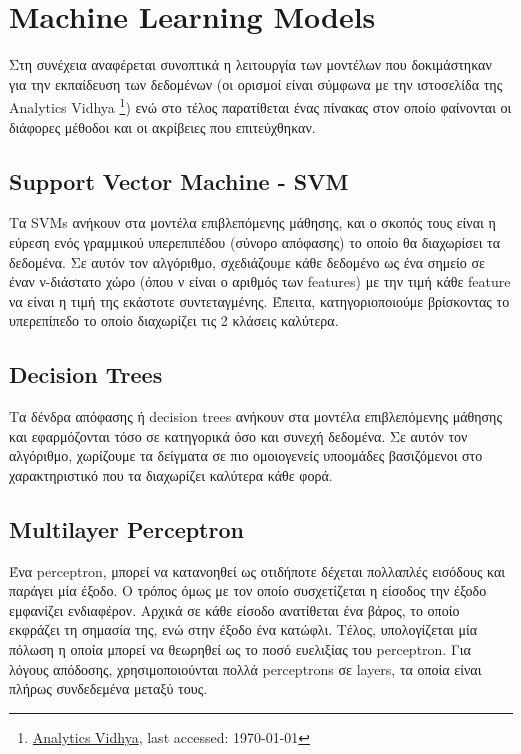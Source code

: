\section{Machine Learning Models}

Στη συνέχεια αναφέρεται συνοπτικά η λειτουργία των μοντέλων που δοκιμάστηκαν για την εκπαίδευση των δεδομένων (οι ορισμοί είναι σύμφωνα με την ιστοσελίδα της Analytics Vidhya \footnote{\href{https://www.analyticsvidhya.com/}{Analytics Vidhya}, last accessed: \today}) ενώ στο τέλος παρατίθεται ένας πίνακας στον οποίο φαίνονται οι διάφορες μέθοδοι και οι ακρίβειες που επιτεύχθηκαν.

\subsection{Support Vector Machine - SVM}

Τα SVMs ανήκουν στα μοντέλα επιβλεπόμενης μάθησης, και ο σκοπός τους είναι η εύρεση ενός γραμμικού υπερεπιπέδου (σύνορο απόφασης) το οποίο θα διαχωρίσει τα δεδομένα. Σε αυτόν τον αλγόριθμο, σχεδιάζουμε κάθε δεδομένο ως ένα σημείο σε έναν ν-διάστατο χώρο (όπου ν είναι ο αριθμός των features) με την τιμή κάθε feature να είναι η τιμή της εκάστοτε συντεταγμένης. Έπειτα, κατηγοριοποιούμε βρίσκοντας το υπερεπίπεδο το οποίο διαχωρίζει τις 2 κλάσεις καλύτερα.

\subsection{Decision Trees}

Τα δένδρα απόφασης ή decision trees ανήκουν στα μοντέλα επιβλεπόμενης μάθησης και εφαρμόζονται τόσο σε κατηγορικά όσο και συνεχή δεδομένα. Σε αυτόν τον αλγόριθμο, χωρίζουμε τα δείγματα σε πιο ομοιογενείς υποομάδες βασιζόμενοι στο χαρακτηριστικό που τα διαχωρίζει καλύτερα κάθε φορά.

\subsection{Multilayer Perceptron}

Ένα perceptron, μπορεί να κατανοηθεί ως οτιδήποτε δέχεται πολλαπλές εισόδους και παράγει μία έξοδο. Ο τρόπος όμως με τον οποίο συσχετίζεται η είσοδος την έξοδο εμφανίζει ενδιαφέρον. Αρχικά σε κάθε είσοδο ανατίθεται ένα βάρος, το οποίο εκφράζει τη σημασία της, ενώ στην έξοδο ένα κατώφλι. Τέλος, υπολογίζεται μία πόλωση η οποία μπορεί να θεωρηθεί ως το ποσό ευελιξίας του perceptron. Για λόγους απόδοσης, χρησιμοποιούνται πολλά perceptrons σε layers, τα οποία είναι πλήρως συνδεδεμένα μεταξύ τους.

